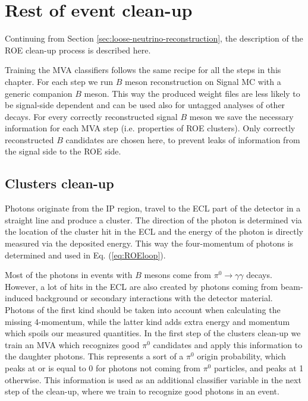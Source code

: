 \chapter{Rest of event clean-up}
\label{ch:roe}

Continuing from Section \ref{sec:loose-neutrino-reconstruction}, the description of the ROE clean-up process is described here. 

Training the MVA classifiers follows the same recipe for all the steps in this chapter. For each step we run $B$ meson reconstruction on Signal MC with a generic companion $B$ meson. This way the produced weight files are less likely to be signal-side dependent and can be used also for untagged analyses of other decays. For every correctly reconstructed signal $B$ meson we save the necessary information for each MVA step (i.e. properties of ROE clusters). Only correctly reconstructed $B$ candidates are chosen here, to prevent leaks of information from the signal side to the ROE side.

\section{Clusters clean-up}

Photons originate from the IP region, travel to the ECL part of the detector in a straight line and produce a cluster. The direction of the photon is determined via the location of the cluster hit in the ECL and the energy of the photon is directly measured via the deposited energy. This way the four-momentum of photons is determined and used in Eq. (\ref{eq:ROEloop}).

Most of the photons in events with $B$ mesons come from $\pi^0 \to \gamma \gamma$ decays. However, a lot of hits in the ECL are also created by photons coming from beam-induced background or secondary interactions with the detector material. Photons of the first kind should be taken into account when calculating the missing 4-momentum, while the latter kind adds extra energy and momentum which spoils our measured quantities. In the first step of the clusters clean-up we train an MVA which recognizes good $\pi^0$ candidates and apply this information to the daughter photons. This represents a sort of a $\pi^0$ origin probability, which peaks at or is equal to 0 for photons not coming from $\pi^0$ particles, and peaks at 1 otherwise. This information is used as an additional classifier variable in the next step of the clean-up, where we train to recognize good photons in an event.

